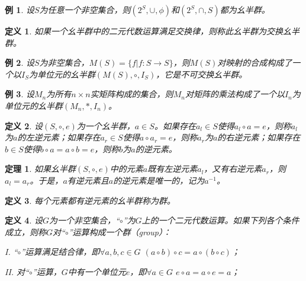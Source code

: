 \documentclass{article}
\newtheorem{Def}{定义}
\newtheorem{Thm}{定理}
\newtheorem*{Example}{例}
\begin{document}
\begin{CJK*}{UTF8}{gbsn}
\begin{Example}
  设$S$为任意一个非空集合，则$(2^S,\cup,\phi)$和$(2^S,\cap,S)$都为幺半群。
\end{Example}

\begin{Def}
  如果一个幺半群中的二元代数运算满足交换律，则称此幺半群为交换幺半群。
\end{Def}

\begin{Example}
  设$S$为非空集合，$M(S)=\{f|f:S\to S\}$，则$M(S)$对映射的合成构成了一个以$I_S$为单位元的幺半群$(M(S),\circ,I_S)$，它是不可交换幺半群。
\end{Example}
\begin{Example}
  设$M_n$为所有$n\times n$实矩阵构成的集合，则$M_n$对矩阵的乘法构成了一个以$I_n$为单位元的幺半群$(M_n,*,I_n)$。
\end{Example}


\begin{Def}
  设$(S,\circ,e)$为一个幺半群，$a\in S$。如果存在$a_l\in S$使得$a_l\circ a=e$，则称$a_l$为$a$的左逆元素；如果存在$a_r
  \in S$使得$a\circ a_r=e$，则称$a_r$为$a$的右逆元素；如果存在$b\in S$使得$b\circ a=a\circ b=e$，则称$b$为$a$的逆元素。
\end{Def}
\begin{Thm}
  如果幺半群$(S,\circ,e)$中的元素$a$既有左逆元素$a_l$，又有右逆元素$a_r$，则$a_l=a_r$。于是，$a$有逆元素且$a$的逆元素是唯一的，记为$a^{-1}$。
\end{Thm}
\begin{Def}
  每个元素都有逆元素的幺半群称为群。
\end{Def}

\begin{Def}
  设$G$为一个非空集合，“$\circ$”为$G$上的一个二元代数运算。如果下列各个条件成立，则称$G$对“$\circ$”运算构成一个群（group）：

  I. “$\circ$”运算满足结合律，即$\forall a,b,c \in G$ $(a\circ b)\circ c = a\circ(b\circ c)$；

  II. 对“$\circ$”运算，$G$中有一个单位元$e$，即$\forall a\in G$ $e\circ a =a\circ e= a$；


\end{Def}
\end{CJK*}
\end{document}
